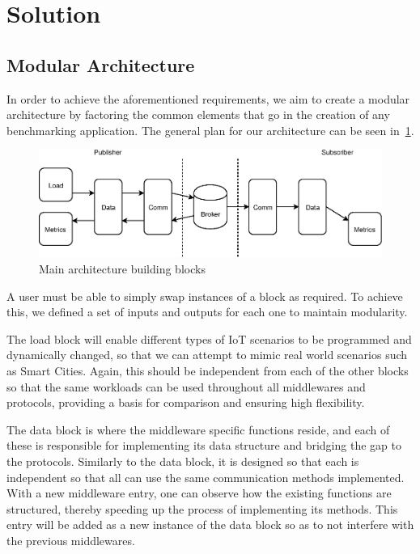 \documentclass[conference]{IEEEtran}
\begin{document}
\section{Solution}

\subsection{Modular Architecture}

In order to achieve the aforementioned requirements, we aim to create a modular architecture by factoring the common elements that go in the creation of any benchmarking application. The general plan for our architecture can be seen in~\ref{fig:benchmark_architecture}.

\begin{figure}[htbp!]
  \centering
  \includegraphics[width=\linewidth]{figures/benchmark_architecture.eps}
  \caption{Main architecture building blocks}
  \label{fig:benchmark_architecture}
\end{figure}

A user must be able to simply swap instances of a block as required. To achieve this, we defined a set of inputs and outputs for each one to maintain modularity. 

The load block will enable different types of IoT scenarios to be programmed and dynamically changed, so that we can attempt to mimic real world scenarios such as Smart Cities. Again, this should be independent from each of the other blocks so that the same workloads can be used throughout all middlewares and protocols, providing a basis for comparison and ensuring high flexibility. 
    
The data block is where the middleware specific functions reside, and each of these is responsible for implementing its data structure and bridging the gap to the protocols. Similarly to the data block, it is designed so that each is independent so that all can use the same communication methods implemented. With a new middleware entry, one can observe how the existing functions are structured, thereby speeding up the process of implementing its methods. This entry will be added as a new instance of the data block so as to not interfere with the previous middlewares.
\end{document}
